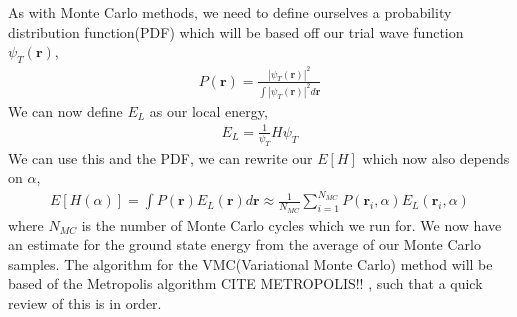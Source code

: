 \documentclass[11pt]{article}
\newcommand{\husk}[1]{\color{red} #1 \color{black}}
\begin{document}
As with Monte Carlo methods, we need to define ourselves a probability distribution function(PDF) which will be based off our trial wave function $\psi_T(\mathbf{r})$,
\begin{align}
	P(\mathbf{r}) = \frac{|\psi_T(\mathbf{r})|^2}{\int |\psi_T(\mathbf{r})|^2d\mathbf{r}}
	\label{eq:pdf}
\end{align}
We can now define $E_L$ as our local energy,
\begin{align}
	E_L = \frac{1}{\psi_T}H\psi_T
	\label{eq:local-energy}
\end{align}
We can use this and the PDF, we can rewrite our $E[H]$ which now also depends on $\alpha$,
\begin{align*}
	E[H(\alpha)] = \int P(\mathbf{r})E_L(\mathbf{r})d\mathbf{r} \approx \frac{1}{N_{MC}}\sum^{N_{MC}}_{i=1}P(\mathbf{r}_i,\alpha)E_L(\mathbf{r}_i,\alpha)
\end{align*}
where $N_{MC}$ is the number of Monte Carlo cycles which we run for. 
We now have an estimate for the ground state energy from the average of our Monte Carlo samples. The algorithm for the VMC(Variational Monte Carlo) method will be based of the Metropolis algorithm \husk{CITE METROPOLIS!!}, such that a quick review of this is in order.
\end{document}
